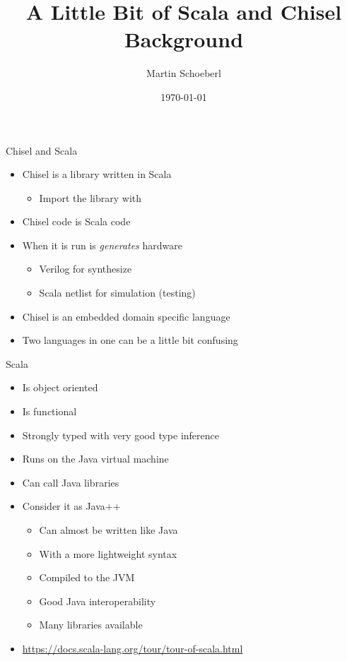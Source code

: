 

\newif\ifbook


\title{A Little Bit of Scala and Chisel Background}
\author{Martin Schoeberl}
\date{\today}



\begin{frame}
\titlepage
\end{frame}

\begin{frame}[fragile]{Chisel and Scala}
\begin{itemize}
\item Chisel is a library written in Scala
\begin{itemize}
\item Import the library with 
\end{itemize}
\item Chisel code is Scala code
\item When it is run is \emph{generates} hardware
\begin{itemize}
\item Verilog for synthesize
\item Scala netlist for simulation (testing)
\end{itemize}
\item Chisel is an embedded domain specific language
\item Two languages in one can be a little bit confusing
\end{itemize}
\end{frame}

\begin{frame}[fragile]{Scala}
\begin{itemize}
\item Is object oriented
\item Is functional
\item Strongly typed with very good type inference
\item Runs on the Java virtual machine
\item Can call Java libraries
\item Consider it as Java++
\begin{itemize}
\item Can almost be written like Java
\item With a more lightweight syntax
\item Compiled to the JVM
\item Good Java interoperability
\item Many libraries available
\end{itemize}
\item \url{https://docs.scala-lang.org/tour/tour-of-scala.html}
\end{itemize}
\end{frame}

